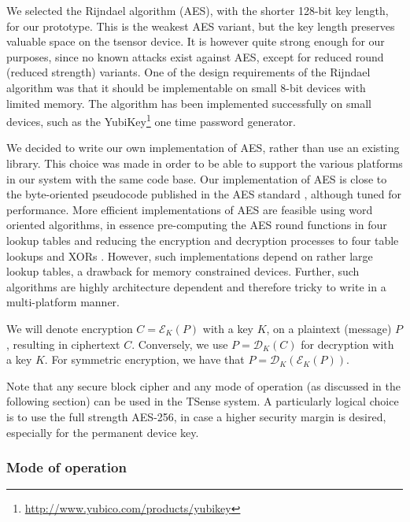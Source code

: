 We selected the Rijndael algorithm (AES), with the shorter 128-bit key length, for our prototype. This is the weakest AES variant, but the key length preserves valuable space on the tsensor device. It is however quite strong enough for our purposes, since no known attacks exist against AES, except for reduced round (reduced strength) variants. One of the design requirements of the Rijndael algorithm was that it should be implementable on small 8-bit devices with limited memory. The algorithm has been implemented successfully on small devices, such as the YubiKey\footnote{\url{http://www.yubico.com/products/yubikey}} one time password generator.

We decided to write our own implementation of AES, rather than use an existing library. This choice was made in order to be able to support the various platforms in our system with the same code base. Our implementation of AES is close to the byte-oriented pseudocode published in the AES standard , although tuned for performance. More efficient implementations of AES are feasible using word oriented algorithms, in essence pre-computing the AES round functions in four lookup tables and reducing the encryption and decryption processes to four table lookups and XORs \cite[Section 5.2]{daemen1999}. However, such implementations depend on rather large lookup tables, a drawback for memory constrained devices. Further, such algorithms are highly architecture dependent and therefore tricky to write in a multi-platform manner. 

We will denote encryption $C=\mathcal{E}_K(P)$ with a key $K$, on a plaintext (message) $P$, resulting in ciphertext $C$. Conversely, we use $P=\mathcal{D}_K(C)$ for decryption with a key $K$. For symmetric encryption, we have that $P=\mathcal{D}_K(\mathcal{E}_K(P))$.

Note that any secure block cipher and any mode of operation (as discussed in the following section) can be used in the TSense system. A particularly logical choice is to use the full strength AES-256, in case a higher security margin is desired, especially for the permanent device key.

\subsubsection{Mode of operation}

